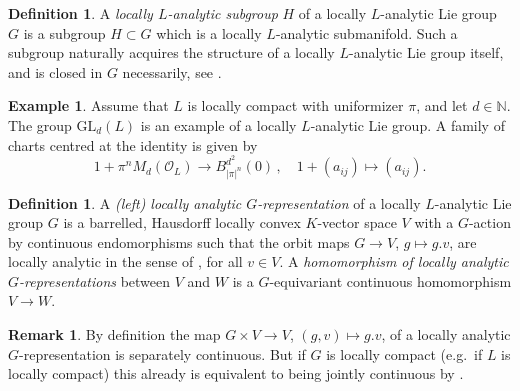 \documentclass[a4paper, reqno, 10pt]{amsart}
\theoremstyle{definition}
\newtheorem{definition}[theorem]{Definition}
\newtheorem{example}[theorem]{Example}
\newtheorem{remark}[theorem]{Remark}
\numberwithin{equation}{section}
\newcommand{\abs}[1]{{\lvert{#1}\rvert}}
\newcommand{\GL}{{\mathrm{GL}}}
\newcommand{\lra}{\longrightarrow}
\newcommand{\lto}{\longmapsto}
\newcommand{\mto}{\mapsto}
\newcommand{\ra}{\rightarrow}
\newcommand{\BN}{{\mathbb {N}}}
\newcommand{\CO}{{\mathcal {O}}}
\newcommand{\unif}{{\pi}}
\begin{document}
\begin{definition}
	A \textit{locally $L$-analytic subgroup} $H$ of a locally $L$-analytic Lie group $G$ is a subgroup $H \subset G$ which is a locally $L$-analytic submanifold.
	Such a subgroup naturally acquires the structure of a locally $L$-analytic Lie group itself, and is closed in $G$ necessarily, see \cite[5.12.3]{Bourbaki07VarDiffAnFasciDeResult}.
\end{definition}





\begin{example}
	Assume that $L$ is locally compact with uniformizer $\unif$, and let $d\in \BN$.
	The group $\GL_d(L)$ is an example of a locally $L$-analytic Lie group.
	A family of charts centred at the identity is given by 
	\begin{equation*}
		1 + \unif^n M_d(\CO_L) \lra B^{d^2}_{\abs{\unif}^n} (0) \,,\quad 1 +(a_{ij}) \lto (a_{ij}).
	\end{equation*}
\end{example}





\begin{definition}
	A \textit{(left) locally analytic $G$-representation} of a locally $L$-analytic Lie group $G$ is a barrelled, Hausdorff locally convex $K$-vector space $V$ with a $G$-action by continuous endomorphisms such that the orbit maps $G \ra V$, $g \mto g.v$, are locally analytic in the sense of , for all $v\in V$.
	A \textit{homomorphism of locally analytic $G$-representations} between $V$ and $W$ is a $G$-equivariant continuous homomorphism $V \ra W$.
\end{definition}

\begin{remark}
	By definition the map $G\times V \ra V$, $(g,v)\mto g.v$, of a locally analytic $G$-representation is separately continuous.
	But if $G$ is locally compact (e.g.\ if $L$ is locally compact) this already is equivalent to being jointly continuous by .
\end{remark}
\end{document}
